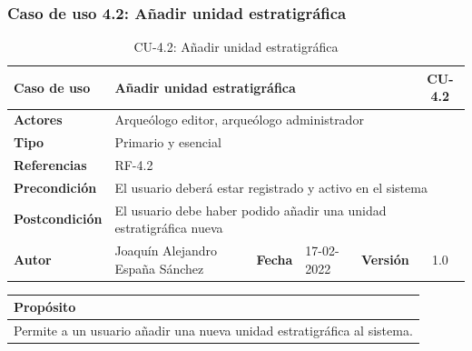 \subsubsection{Caso de uso 4.2: Añadir unidad estratigráfica}

    \begin{table}[H]
    \begin{center}
        \begin{adjustbox}{width=\textwidth}
        \begin{tabular}{ | l | l | l | l | c | c | } 
            \hline
            \textbf{Caso de uso} & \multicolumn{4}{l|}{Añadir unidad estratigráfica} & \cellcolor{gray!50} \textbf{CU-4.2}\\
            \hline
            \textbf{Actores} & \multicolumn{5}{p{0.9\linewidth}|}{Arqueólogo editor, arqueólogo administrador} \\
            \hline
            \textbf{Tipo} & \multicolumn{5}{l|}{Primario y esencial} \\
            \hline
            \textbf{Referencias} & \multicolumn{3}{l|}{RF-4.2} & \multicolumn{2}{l|}{ }\\
            \hline
            \textbf{Precondición} & \multicolumn{5}{l|}{El usuario deberá estar registrado y activo en el sistema} \\
            \hline
            \textbf{Postcondición} & \multicolumn{5}{l|}{El usuario debe haber podido añadir una unidad estratigráfica nueva} \\
            \hline
            \textbf{Autor} & \multicolumn{1}{p{0.25\linewidth}|}{Joaquín Alejandro España Sánchez} & \textbf{Fecha} & 
            17-02-2022     & \textbf{Versión}                                                      & 1.0\\
            \hline
        \end{tabular}
        \end{adjustbox}
        \caption{CU-4.2: Añadir unidad estratigráfica}
        \label{tab:add-ue}
    \end{center}
    \end{table}

    \begin{table}[H]
        \centering
        \begin{tabularx}{\textwidth}{@{} |L |@{}} \hline
            \textbf{Propósito} \\
            \hline
            Permite a un usuario añadir una nueva unidad estratigráfica al sistema. \\
            \hline
        \end{tabularx}
    \end{table}

